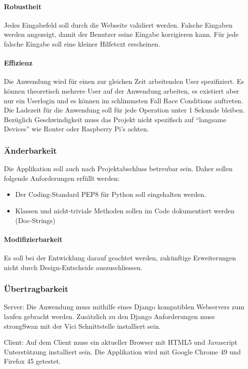 \paragraph{Robustheit}
Jedes Eingabefeld soll durch die Webseite validiert werden. Falsche Eingaben werden angezeigt, damit der Benutzer seine Eingabe korrigieren kann. Für jede falsche Eingabe soll eine kleiner Hilfetext erscheinen.

\paragraph{Effizienz}
Die Anwendung wird für einen zur gleichen Zeit arbeitenden User spezifiziert. Es können theoretisch mehrere User auf der Anwendung arbeiten, es existiert aber nur ein Userlogin und es können im schlimmsten Fall Race Conditions auftreten.
Die Ladezeit für die Anwendung soll für jede Operation unter 1 Sekunde bleiben. Bezüglich Geschwindigkeit muss das Projekt nicht spezifisch auf “langsame Devices” wie Router oder Raspberry Pi's achten.

\subsubsection{Änderbarkeit}
Die Applikation soll auch nach Projektabschluss betreubar sein. Daher sollen folgende Anforderungen erfüllt werden: 
\begin{itemize}
	\item Der Coding-Standard PEP8 für Python soll eingehalten werden.
	\item Klassen und nicht-triviale Methoden sollen im Code dokumentiert werden (Doc-Strings)
\end{itemize}

\paragraph{Modifizierbarkeit}
Es soll bei der Entwicklung darauf geachtet werden, zukünftige Erweiterungen nicht durch Design-Entscheide auszuschliessen.


\subsubsection{Übertragbarkeit}
Server: Die Anwendung muss mithilfe eines Django kompatiblen Webservers zum laufen gebracht werden. Zusätzlich zu den Django Anforderungen muss strongSwan mit der Vici Schnittstelle installiert sein.

Client: Auf dem Client muss ein aktueller Browser mit HTML5 und Javascript Unterstützung installiert sein. Die Applikation wird mit Google Chrome 49 und Firefox 45 getestet.

